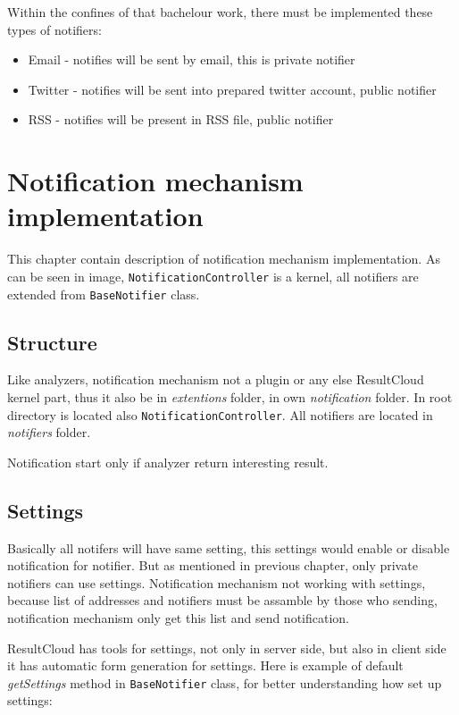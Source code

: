 Within the confines of that bachelour work, there must be implemented these types of notifiers:
\begin{itemize} 
\item Email - notifies will be sent by email, this is private notifier
\item Twitter - notifies will be sent into prepared twitter account, public notifier
\item RSS - notifies will be present in RSS file, public notifier
\end{itemize}  

\chapter{Notification mechanism implementation}
\label{ch:notification_implement}

This chapter contain description of notification mechanism implementation. As can be seen in image, \texttt{NotificationController} is a kernel, all notifiers are extended from \texttt{BaseNotifier} class.

\section{Structure}

Like analyzers, notification mechanism not a plugin or any else ResultCloud kernel part, thus it also be in \emph{extentions} folder, in own \emph{notification} folder. In root directory is located also \texttt{NotificationController}. All notifiers are located in \emph{notifiers} folder.

Notification start only if analyzer return interesting result.

\section{Settings}

Basically all notifers will have same setting, this settings would enable or disable notification for notifier. But as mentioned in previous chapter, only private notifiers can use settings. Notification mechanism not working with settings, because list of addresses and notifiers must be assamble by those who sending, notification mechanism only get this list and send notification. 

ResultCloud has tools for settings, not only in server side, but also in client side it has automatic form generation for settings. Here is example of default \emph{getSettings} method in \texttt{BaseNotifier} class, for better understanding how set up settings:


